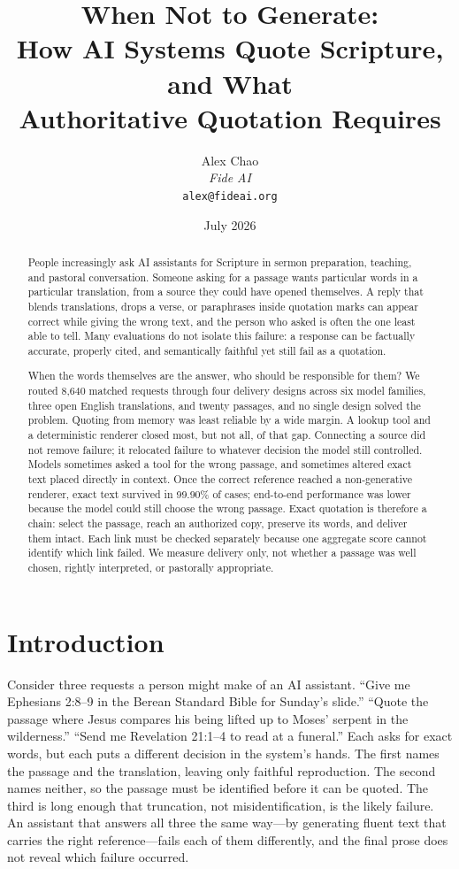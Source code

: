 \documentclass[11pt]{article}
\title{When Not to Generate:\\
       How AI Systems Quote Scripture, and What\\
       Authoritative Quotation Requires}
\author{Alex Chao\\
        \textit{Fide AI}\\
        \texttt{alex@fideai.org}}
\date{July 2026}
\begin{document}
\maketitle

\begin{abstract}
People increasingly ask AI assistants for Scripture in sermon preparation,
teaching, and pastoral conversation. Someone asking for a passage wants
particular words in a particular translation, from a source they could have
opened themselves. A reply that blends translations, drops a verse, or
paraphrases inside quotation marks can appear correct while giving the wrong
text, and the person who asked is often the one least able to tell. Many
evaluations do not isolate this failure: a response can be factually accurate,
properly cited, and semantically faithful yet still fail as a quotation.

When the words themselves are the answer, who should be responsible for them?
We routed 8,640 matched requests through four delivery designs across six model
families, three open English translations, and twenty passages, and no single design
solved the problem. Quoting from memory was least reliable by a wide margin. A
lookup tool and a deterministic renderer closed most, but not all, of that gap.
Connecting a source did not remove failure; it relocated failure to whatever
decision the model still controlled.
Models sometimes asked a tool for the wrong passage, and sometimes altered
exact text placed directly in context. Once the correct reference reached a
non-generative renderer, exact text survived in 99.90\% of cases; end-to-end
performance was lower because the model could still choose the wrong passage.
Exact quotation is therefore a chain: select the passage, reach an authorized
copy, preserve its words, and deliver them intact. Each link must be checked
separately because one aggregate score cannot identify which link failed. We
measure delivery only, not whether a passage was well chosen, rightly
interpreted, or pastorally appropriate.
\end{abstract}

\section{Introduction}
\label{sec:introduction}

Consider three requests a person might make of an AI assistant. ``Give me
Ephesians 2:8--9 in the Berean Standard Bible for Sunday's slide.'' ``Quote the
passage where Jesus compares his being lifted up to Moses' serpent in the
wilderness.'' ``Send me Revelation 21:1--4 to read at a funeral.''
Each asks for exact words, but each puts a different decision in the system's
hands. The first names the passage and the translation, leaving only faithful
reproduction. The second names neither, so the passage must be identified
before it can be quoted. The third is long enough that truncation, not
misidentification, is the likely failure. An assistant that answers all three
the same way---by generating fluent text that carries the right
reference---fails each of them differently, and the final prose does not reveal
which failure occurred.
\end{document}

